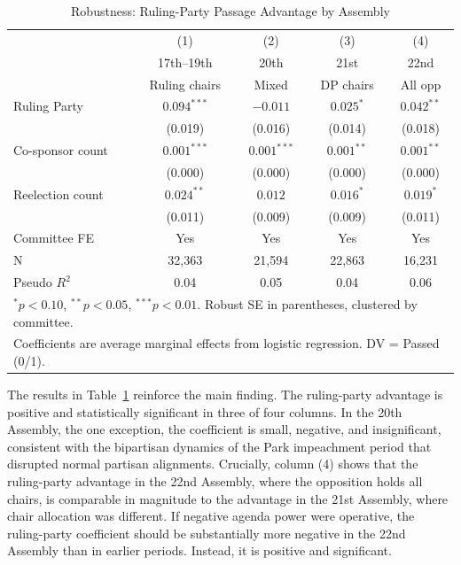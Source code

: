 \documentclass[11pt]{article}
\begin{document}
\begin{table}[H]
\centering
\caption{Robustness: Ruling-Party Passage Advantage by Assembly}
\label{tab:robust}
\begin{tabular}{lcccc}
\toprule
& (1) & (2) & (3) & (4) \\
& 17th--19th & 20th & 21st & 22nd \\
& Ruling chairs & Mixed & DP chairs & All opp \\
\midrule
Ruling Party & $0.094^{***}$ & $-0.011$ & $0.025^{*}$ & $0.042^{**}$ \\
& (0.019) & (0.016) & (0.014) & (0.018) \\[4pt]
Co-sponsor count & $0.001^{***}$ & $0.001^{***}$ & $0.001^{**}$ & $0.001^{**}$ \\
& (0.000) & (0.000) & (0.000) & (0.000) \\[4pt]
Reelection count & $0.024^{**}$ & $0.012$ & $0.016^{*}$ & $0.019^{*}$ \\
& (0.011) & (0.009) & (0.009) & (0.011) \\[4pt]
\midrule
Committee FE & Yes & Yes & Yes & Yes \\
N & 32,363 & 21,594 & 22,863 & 16,231 \\
Pseudo $R^2$ & 0.04 & 0.05 & 0.04 & 0.06 \\
\bottomrule
\multicolumn{5}{l}{\footnotesize $^*p<0.10$, $^{**}p<0.05$, $^{***}p<0.01$. Robust SE in parentheses, clustered by committee.} \\
\multicolumn{5}{l}{\footnotesize Coefficients are average marginal effects from logistic regression. DV = Passed (0/1).} \\
\end{tabular}
\end{table}

The results in Table~\ref{tab:robust} reinforce the main finding. The ruling-party advantage is positive and statistically significant in three of four columns. In the 20th Assembly, the one exception, the coefficient is small, negative, and insignificant, consistent with the bipartisan dynamics of the Park impeachment period that disrupted normal partisan alignments. Crucially, column (4) shows that the ruling-party advantage in the 22nd Assembly, where the opposition holds all chairs, is comparable in magnitude to the advantage in the 21st Assembly, where chair allocation was different. If negative agenda power were operative, the ruling-party coefficient should be substantially more negative in the 22nd Assembly than in earlier periods. Instead, it is positive and significant.
\end{document}
